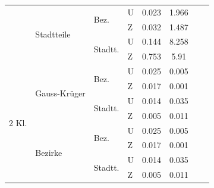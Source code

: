 \documentclass{Vorlage}
\begin{document}
\begin{table}[h]
\begin{tabular}{llll|cc|cc}
                        & \multirow{4}{*}{Stadtteile}   & \multirow{2}{*}{Bez.}    & U & 0.023       & 1.966      &                   &                 \\
                        &                               &                          & Z & 0.032       & 1.487      &                   &                 \\ \cline{3-8} 
                        &                               & \multirow{2}{*}{Stadtt.} & U & 0.144       & 8.258      &                   &                 \\
                        &                               &                          & Z & 0.753       & 5.91       &                   &                 \\ \hline
\multirow{8}{*}{2 Kl.}  & \multirow{4}{*}{Gauss-Krüger} & \multirow{2}{*}{Bez.}    & U & 0.025       & 0.005      &                   &                 \\
                        &                               &                          & Z & 0.017       & 0.001      &                   &                 \\ \cline{3-8} 
                        &                               & \multirow{2}{*}{Stadtt.} & U & 0.014       & 0.035      &                   &                 \\
                        &                               &                          & Z & 0.005       & 0.011      &                   &                 \\ \cline{2-8} 
                        & \multirow{4}{*}{Bezirke}      & \multirow{2}{*}{Bez.}    & U & 0.025       & 0.005      &                   &                 \\
                        &                               &                          & Z & 0.017       & 0.001      &                   &                 \\ \cline{3-8} 
                        &                               & \multirow{2}{*}{Stadtt.} & U & 0.014       & 0.035      &                   &                 \\
                        &                               &                          & Z & 0.005       & 0.011      &                   &                 \\ \hline \hline
\end{tabular}
\end{table}

\end{document}
